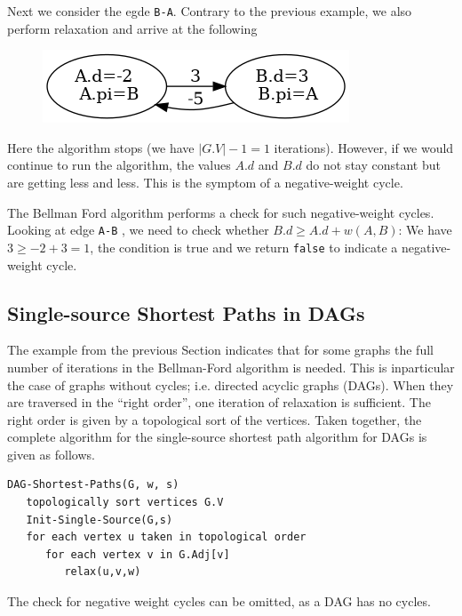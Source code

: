 Next we consider the egde \verb|B-A|. Contrary to the previous example, we also perform relaxation and arrive at the following

\begin{figure}[H]
\centering
\includegraphics[scale=0.5]{images/sssp_18.png}
\end{figure}

Here the algorithm stops (we have $|G.V| -1 = 1$ iterations). However, if we would continue to run the algorithm, the values $A.d$ and $B.d$ do not stay constant but are getting less and less. This is the symptom of a negative-weight cycle.

The Bellman Ford algorithm performs a check for such negative-weight cycles. Looking at edge \verb|A-B| , we need to check whether $B.d \geq A.d + w(A,B)$: We have $3 \geq -2 + 3 = 1$, the condition is true and we return \verb|false|  to indicate a negative-weight cycle.


\subsection{Single-source Shortest Paths in DAGs}

The example from the previous Section indicates that for some graphs the full number of iterations in the Bellman-Ford algorithm is needed. This is inparticular the case of graphs without cycles; i.e. directed acyclic graphs (DAGs). When they are traversed in the ``right order'', one iteration of relaxation is sufficient. The right order is given by a topological sort of the vertices. Taken together, the complete algorithm for the single-source shortest path algorithm for DAGs is given as follows.

\begin{verbatim}
DAG-Shortest-Paths(G, w, s)
   topologically sort vertices G.V
   Init-Single-Source(G,s)
   for each vertex u taken in topological order
      for each vertex v in G.Adj[v]
         relax(u,v,w)
\end{verbatim}

The check for negative weight cycles can be omitted, as a DAG has no cycles.



